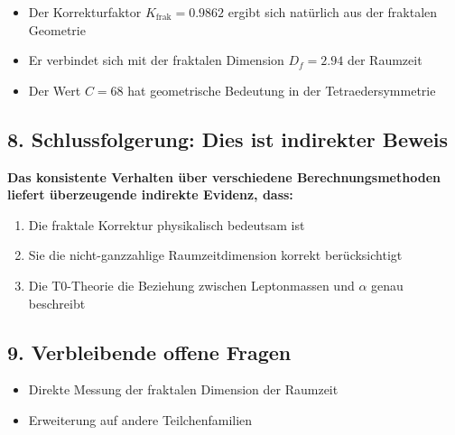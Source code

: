 \documentclass[12pt,a4paper]{article}
\begin{document}
\begin{itemize}
	\item Der Korrekturfaktor $K_{\text{frak}} = 0.9862$ ergibt sich natürlich aus der fraktalen Geometrie
	\item Er verbindet sich mit der fraktalen Dimension $D_f = 2.94$ der Raumzeit
	\item Der Wert $C = 68$ hat geometrische Bedeutung in der Tetraedersymmetrie
\end{itemize}

\subsection{8. Schlussfolgerung: Dies ist indirekter Beweis}

\begin{tcolorbox}[colback=red!5!white,colframe=red!75!black]
	\textbf{Das konsistente Verhalten über verschiedene Berechnungsmethoden liefert überzeugende indirekte Evidenz, dass:}
	\begin{enumerate}
		\item Die fraktale Korrektur physikalisch bedeutsam ist
		\item Sie die nicht-ganzzahlige Raumzeitdimension korrekt berücksichtigt
		\item Die T0-Theorie die Beziehung zwischen Leptonmassen und $\alpha$ genau beschreibt
	\end{enumerate}
\end{tcolorbox}

\subsection{9. Verbleibende offene Fragen}

\begin{itemize}
	\item Direkte Messung der fraktalen Dimension der Raumzeit
	\item Erweiterung auf andere Teilchenfamilien
\end{itemize}
\end{document}
